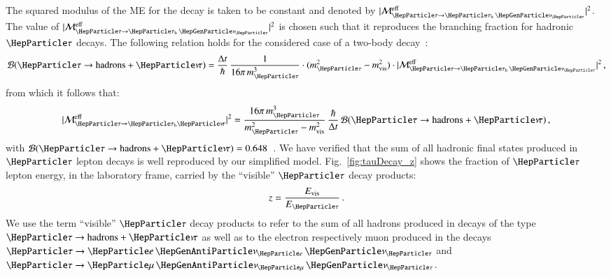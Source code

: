 The squared modulus of the ME for the decay is taken to be constant and denoted by $\vert\mathcal{M}^{\eff}_{\Pgt \to \tauhnu}\vert^{2}$.
The value of $\vert\mathcal{M}^{\eff}_{\Pgt \to \tauhnu}\vert^{2}$ is
chosen such that it reproduces the branching fraction for hadronic $\Pgt$ decays.
The following relation holds for the considered case of a two-body decay~\cite{Barger:1987nn}:
\begin{equation}
\mathcal{B}(\Pgt \to \textrm{hadrons} + \Pnut) = \frac{\Delta
  t}{\hbar} \, \frac{1}{16 \pi \, m_{\Pgt}^{3}} \cdot (m_{\Pgt}^{2} - m_{\vis}^{2}) \cdot \vert \mathcal{M}^{\textrm{eff}}_{\Pgt \to
  \tauhnu} \vert^{2} \, ,
\end{equation}
from which it follows that:
\begin{equation}
\vert \mathcal{M}^{\textrm{eff}}_{\Pgt \to \tauh\Pnut} \vert^{2} = \frac{16 \pi \, m_{\Pgt}^{3}}{m_{\Pgt}^{2} - m_{\vis}^{2}} \, \frac{\hbar}{\Delta t} \, \mathcal{B}(\Pgt \to \textrm{hadrons} + \Pnut) \, , 
\end{equation}
with $\mathcal{B}(\Pgt \to \textrm{hadrons} + \Pnut) = 0.648$~\cite{PDG}.
We have verified that the sum of all hadronic final states produced in $\Pgt$ lepton decays
is well reproduced by our simplified model.
Fig.~\ref{fig:tauDecay_z} shows the fraction of $\Pgt$ lepton energy,
in the laboratory frame, carried by the ``visible'' $\Pgt$ decay
products:
\begin{equation}
z = \frac{E_{\vis}}{E_{\Pgt}} \, .
\label{eq:def_z}
\end{equation}
We use the term ``visible'' $\Pgt$ decay products to refer to the sum
of all hadrons produced in decays of the type $\Pgt \to \textrm{hadrons} + \Pnut$ 
as well as to the electron respectively muon produced in the decays $\Pgt \to \enunu$ and $\Pgt \to \mununu$.

